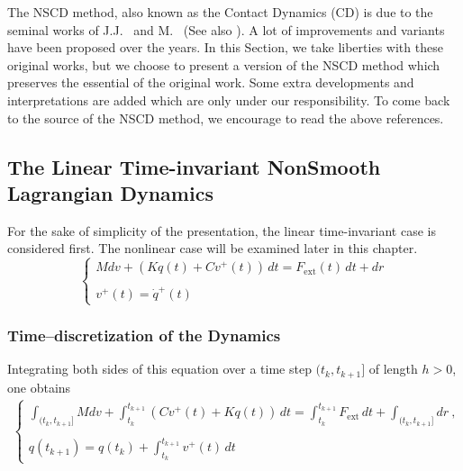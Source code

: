 The NSCD method, also known as the Contact Dynamics (CD) is due to the seminal works of J.J.~\cite{Moreau1983,Moreau1985,Moreau1988,Moreau1994,Moreau1999} and M.~\cite{Jean88,Jean1999}  (See also \citep{Jean.Pratt85,Jean.Moreau91,Jean.Moreau92}). A lot of improvements and variants have been proposed over the years. In this Section,  we take  liberties with these original works, but we  choose to present a version of the NSCD method which preserves the essential of the original work. Some  extra developments and interpretations are added which are only under our responsibility. To come back to the source of the NSCD method, we encourage to read the above references.

\subsection{The Linear Time-invariant NonSmooth Lagrangian Dynamics}
\label{section11.1.1}



 For the sake of simplicity of the presentation, the linear time-invariant case is considered first. The nonlinear case will be examined later in this chapter. 
\begin{equation}
  \label{eq:11-a}
  \begin{cases}
    M dv + (K q(t) + C v^+(t))\,dt = F_{\mathrm{ext}}(t)\,dt + dr  \\ \\
    v^+(t)=\dot{q}^+(t)
  \end{cases}
\end{equation}


\subsubsection{Time--discretization of the Dynamics}


Integrating both sides of this equation over a time step $(t_k,t_{k+1}]$ of length $h>0$, one obtains
\begin{eqnarray}
  \begin{cases}
    \displaystyle \int_{(t_k,t_{k+1}]} M dv + \int_{t_k}^{t_{k+1}} (C v^+(t)
      + K q(t)) \,dt = \displaystyle \int_{t_k}^{t_{k+1}} F_{\mathrm{ext}}\,dt +
        \displaystyle \int_{(t_k,t_{k+1}]} dr \:, \\ \\
     q(t_{k+1}) = q(t_{k}) + \displaystyle \int_{t_k}^{t_{k+1}} v^+(t)\,dt 
   \end{cases}
\end{eqnarray}

